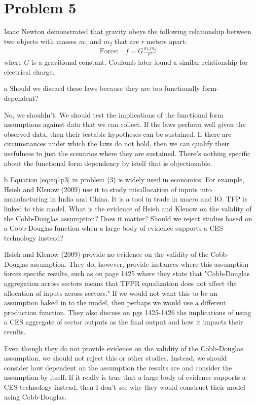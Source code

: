 \documentclass{article}
\begin{document}
\section*{Problem 5}
Isaac Newton demonstrated that gravity obeys the following relationship between two objects with masses $m_{1}$ and $m_{2}$ that are $r$ meters apart:
\begin{align*}
\text{Force:} \quad f=G \frac{m_{1} m_{2}}{r^{2}}
\end{align*}
where $G$ is a gravitional constant. Coulomb later found a similar relationship for electrical charge.
\begin{problem}{a}
Should we discard these laws because they are too functionally form-dependent?
\end{problem}
No, we shouldn't. We should test the implications of the functional form assumptions against data that we can collect. If the laws perform well given the observed data, then their testable hypotheses can be sustained. If there are circumstances under which the laws do not hold, then we can qualify their usefulness to just the scenarios where they are sustained. There's nothing specific about the functional form dependency by istelf that is objectionable.

\begin{problem}{b}
Equation \eqref{eq:eq1p3} in problem (3) is widely used in economics. For example, Hsieh and Klenow (2009) use it to study misallocation of inputs into manufacturing in India and China. It is a tool in trade in macro and IO. TFP is linked to this model. What is the evidence of Hsieh and Klenow on the validity of the Cobb-Douglas assumption? Does it matter? Should we reject studies based on a Cobb-Douglas function when a large body of evidence supports a CES technology instead?
\end{problem}
Hsieh and Klenow (2009) provide no evidence on the validity of the Cobb-Douglas assumption. They do, however, provide instances where this assumption forces specific results, such as on page 1425 where they state that "Cobb-Douglas aggregation across sectors means that TFPR equalization does not affect the allocation of inputs across sectors." If we would not want this to be an assumption baked in to the model, then perhaps we would use a different production function. They also discuss on pgs 1425-1426 the implications of using a CES aggregate of sector outputs as the final output and how it impacts their results.

Even though they do not provide evidence on the validity of the Cobb-Douglas assumption, we should not reject this or other studies. Instead, we should consider how dependent on the assumption the results are and consider the assumption by itself. If it really is true that a large body of evidence supports a CES technology instead, then I don't see why they would construct their model using Cobb-Douglas.
\end{document}
